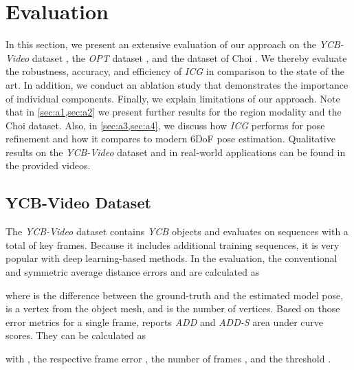 \documentclass[10pt,twocolumn,letterpaper]{article}
\begin{document}
 

\section{Evaluation}\label{sec:e}
In this section, we present an extensive evaluation of our approach on the \textit{YCB-Video} dataset \cite{Xiang2018}, the \textit{OPT} dataset \cite{Wu2017}, and the dataset of Choi \cite{Choi2013}.
We thereby evaluate the robustness, accuracy, and efficiency of \textit{ICG} in comparison to the state of the art.
In addition, we conduct an ablation study that demonstrates the importance of individual components.
Finally, we explain limitations of our approach.
Note that in \cref{sec:a1,sec:a2} we present further results for the region modality and the Choi dataset.
Also, in \cref{sec:a3,sec:a4}, we discuss how \textit{ICG} performs for pose refinement and how it compares to modern \ac{6DoF} pose estimation.
Qualitative results on the \textit{YCB-Video} dataset and in real-world applications can be found in the provided videos.



\subsection{YCB-Video Dataset}\label{ssec:e0}
The \textit{YCB-Video} dataset \cite{Xiang2018} contains  \textit{YCB} objects \cite{Calli2015} and evaluates on  sequences with a total of  key frames.
Because it includes additional training sequences, it is very popular with deep learning-based methods.
In the evaluation, the conventional and symmetric average distance errors  and  \cite{Hinterstoisser2013} are calculated as

where  is the difference between the ground-truth and the estimated model pose,  is a vertex from the object mesh, and  is the number of vertices.
Based on those error metrics for a single frame, \cite{Xiang2018} reports \textit{ADD} and \textit{ADD-S} area under curve scores.
They can be calculated as

with , the respective frame error , the number of frames , and the threshold .
\end{document}
